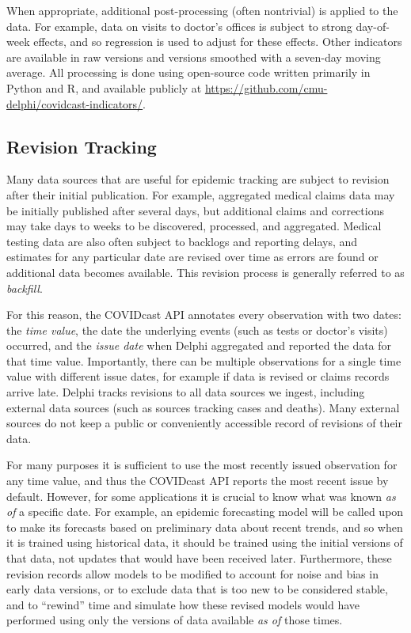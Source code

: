 \documentclass[9pt,twocolumn,twoside,lineno]{pnas-new}
\begin{document}
When appropriate, additional post-processing (often nontrivial) is applied to
the data. For example, data on visits to doctor's offices is subject to strong
day-of-week effects, and so regression is used to adjust for these
effects. Other indicators are available in raw versions and versions smoothed
with a seven-day moving average. All processing is done using open-source code
written primarily in Python and R, and available publicly at
\url{https://github.com/cmu-delphi/covidcast-indicators/}.

\subsection{Revision Tracking}
\label{subsec:revision_tracking}

Many data sources that are useful for epidemic tracking are subject to revision
after their initial publication. For example, aggregated medical claims data may
be initially published after several days, but additional claims and corrections
may take days to weeks to be discovered, processed, and aggregated. Medical
testing data are also often subject to backlogs and reporting delays, and
estimates for any particular date are revised over time as errors are found or
additional data becomes available. This revision process is generally referred
to as \textit{backfill}.

For this reason, the COVIDcast API annotates every observation with two dates:
the \textit{time value}, the date the underlying events (such as tests or
doctor's visits) occurred, and the \textit{issue date} when Delphi aggregated
and reported the data for that time value. Importantly, there can be multiple
observations for a single time value with different issue dates, for example if
data is revised or claims records arrive late. Delphi tracks revisions to all
data sources we ingest, including external data sources (such as sources
tracking cases and deaths). Many external sources do not keep a public or
conveniently accessible record of revisions of their data.

For many purposes it is sufficient to use the most recently issued observation
for any time value, and thus the COVIDcast API reports the most recent issue by
default. However, for some applications it is crucial to know what was known
\textit{as of} a specific date. For example, an epidemic forecasting model will
be called upon to make its forecasts based on preliminary data about recent
trends, and so when it is trained using historical data, it should be trained
using the initial versions of that data, not updates that would have been
received later. Furthermore, these revision records allow models to be modified
to account for noise and bias in early data versions, or to exclude data that is
too new to be considered stable, and to ``rewind'' time and simulate how these
revised models would have performed using only the versions of data available
\textit{as of} those times.
\end{document}
